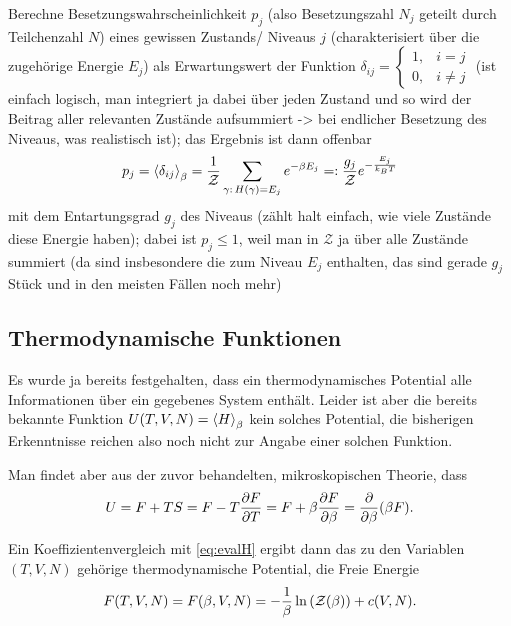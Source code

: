 \documentclass[../KlassMech_main.tex]{subfiles}
\begin{document}
Berechne Besetzungswahrscheinlichkeit $p_j$ (also Besetzungszahl $N_j$ geteilt durch Teilchenzahl $N$) eines gewissen Zustands/ Niveaus $j$ (charakterisiert über die zugehörige Energie $E_j$) als Erwartungswert der Funktion $\delta_{ij} = \begin{cases} 1, & i = j \\ 0, & i \neq j \end{cases}$ (ist einfach logisch, man integriert ja dabei über jeden Zustand und so wird der Beitrag aller relevanten Zustände aufsummiert -> bei endlicher Besetzung des Niveaus, was realistisch ist); das Ergebnis ist dann offenbar
\begin{equation}
p_j = \expval{\delta_{ij}}_\beta = \frac{1}{\mathcal{Z}} \sum_{\gamma: \, H(\gamma) = E_j} e^{-\beta E_j} =: \frac{g_j}{\mathcal{Z}} e^{-\frac{E_j}{k_B T}}
\end{equation}
mit dem Entartungsgrad $g_j$ des Niveaus (zählt halt einfach, wie viele Zustände diese Energie haben); dabei ist $p_j \leq 1$, weil man in $\mathcal{Z}$ ja über alle Zustände summiert (da sind insbesondere die zum Niveau $E_j$ enthalten, das sind gerade $g_j$ Stück und in den meisten Fällen noch mehr)




	\subsection{Thermodynamische Funktionen}
Es wurde ja bereits festgehalten, dass ein thermodynamisches Potential alle Informationen über ein gegebenes System enthält. Leider ist aber die bereits bekannte Funktion $U(T,V,N) = \expval{H}_\beta$ kein solches Potential, die bisherigen Erkenntnisse reichen also noch nicht zur Angabe einer solchen Funktion.

Man findet aber aus der zuvor behandelten, mikroskopischen Theorie, dass
\begin{equation}\label{key}
U = F + T S = F - T \pdv{F}{T} = F + \beta \pdv{F}{\beta} = \pdv{\beta}(\beta F) .
\end{equation}

Ein Koeffizientenvergleich mit \eqref{eq:evalH} ergibt dann das zu den Variablen $(T,V,N)$ gehörige thermodynamische Potential, die Freie Energie
\begin{equation}\label{key}
F(T,V,N) = F(\beta, V, N) = -\frac{1}{\beta} \ln\qty(\mathcal{Z}(\beta)) + c(V, N) .
\end{equation}
\end{document}
